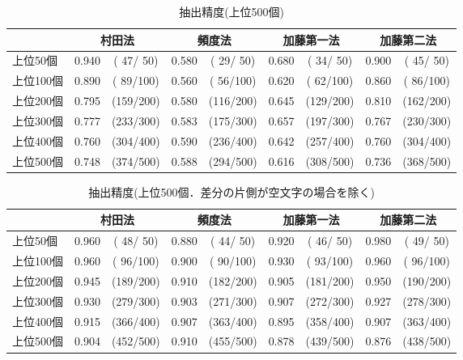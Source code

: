 \begin{table*}[t]
  \begin{center}
    \leavevmode
    \caption{抽出精度(上位500個)}
    \label{tab:seido1}
\begin{tabular}[h]{|l|r@{ }c|r@{ }c|r@{ }c|r@{ }c|}\hline
\multicolumn{1}{|c|}{} & \multicolumn{2}{|c|}{村田法} & \multicolumn{2}{|c|}{頻度法} & \multicolumn{2}{|c|}{加藤第一法} & \multicolumn{2}{|c|}{加藤第二法} \\\hline
上位50個  & 0.940 & ( 47/ 50)& 0.580 & ( 29/ 50)& 0.680 & ( 34/ 50)& 0.900 & ( 45/ 50)\\
上位100個 & 0.890 & ( 89/100)& 0.560 & ( 56/100)& 0.620 & ( 62/100)& 0.860 & ( 86/100)\\
上位200個 & 0.795 & (159/200)& 0.580 & (116/200)& 0.645 & (129/200)& 0.810 & (162/200)\\
上位300個 & 0.777 & (233/300)& 0.583 & (175/300)& 0.657 & (197/300)& 0.767 & (230/300)\\
上位400個 & 0.760 & (304/400)& 0.590 & (236/400)& 0.642 & (257/400)& 0.760 & (304/400)\\
上位500個 & 0.748 & (374/500)& 0.588 & (294/500)& 0.616 & (308/500)& 0.736 & (368/500)\\\hline
\end{tabular}
\end{center}
\end{table*}

\begin{table*}[t]
  \begin{center}
    \leavevmode
    \caption{抽出精度(上位500個．差分の片側が空文字の場合を除く)}
    \label{tab:seido2}
\begin{tabular}[h]{|l|r@{ }c|r@{ }c|r@{ }c|r@{ }c|}\hline
\multicolumn{1}{|c|}{} & \multicolumn{2}{|c|}{村田法} & \multicolumn{2}{|c|}{頻度法} & \multicolumn{2}{|c|}{加藤第一法} & \multicolumn{2}{|c|}{加藤第二法} \\\hline
上位50個  & 0.960 & ( 48/ 50)& 0.880 & ( 44/ 50)& 0.920 & ( 46/ 50)& 0.980 & ( 49/ 50)\\
上位100個 & 0.960 & ( 96/100)& 0.900 & ( 90/100)& 0.930 & ( 93/100)& 0.960 & ( 96/100)\\
上位200個 & 0.945 & (189/200)& 0.910 & (182/200)& 0.905 & (181/200)& 0.950 & (190/200)\\
上位300個 & 0.930 & (279/300)& 0.903 & (271/300)& 0.907 & (272/300)& 0.927 & (278/300)\\
上位400個 & 0.915 & (366/400)& 0.907 & (363/400)& 0.895 & (358/400)& 0.907 & (363/400)\\
上位500個 & 0.904 & (452/500)& 0.910 & (455/500)& 0.878 & (439/500)& 0.876 & (438/500)\\\hline
\end{tabular}
\end{center}
\end{table*}

